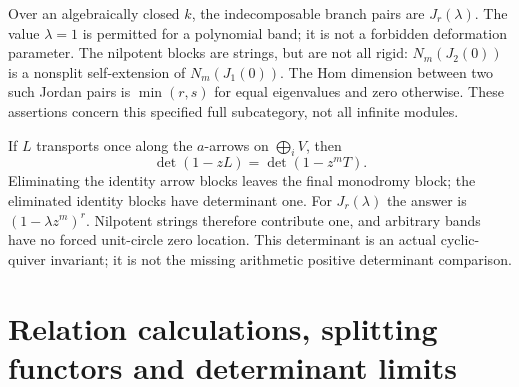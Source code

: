 \documentclass[11pt,oneside,openany]{book}
\theoremstyle{definition}\newtheorem{definition}[theorem]{Definition}
\theoremstyle{remark}\newtheorem{remark}[theorem]{Remark}
\begin{document}
Over an algebraically closed $k$, the indecomposable branch pairs are
$J_r(\lambda)$. The value $\lambda=1$ is permitted for a polynomial band;
it is not a forbidden deformation parameter. The nilpotent blocks are
strings, but are not all rigid: $N_m(J_2(0))$ is a nonsplit self-extension
of $N_m(J_1(0))$. The Hom dimension between two such Jordan pairs is
$\min(r,s)$ for equal eigenvalues and zero otherwise. These assertions
concern this specified full subcategory, not all infinite modules.

If $L$ transports once along the $a$-arrows on $\bigoplus_iV$, then
\begin{equation}\label{rel:det}
 \det(1-zL)=\det(1-z^mT).
\end{equation}
Eliminating the identity arrow blocks leaves the final monodromy block;
the eliminated identity blocks have determinant one. For $J_r(\lambda)$
the answer is $(1-\lambda z^m)^r$. Nilpotent strings therefore contribute
one, and arbitrary bands have no forced unit-circle zero location. This
determinant is an actual cyclic-quiver invariant; it is not the missing
arithmetic positive determinant comparison.

\section{Relation calculations, splitting functors and determinant limits}
\label{rel:details}
\end{document}
